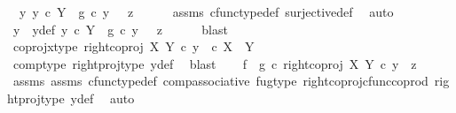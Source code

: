 \begin{isabellebody}
\ {\isachardoublequoteopen}{\isasymexists}\ y{\isachardot}{\kern0pt}\ y\ {\isasymin}\isactrlsub c\ Y\ {\isasymand}\ g\ {\isasymcirc}\isactrlsub c\ y\ \ {\isacharequal}{\kern0pt}\ z{\isachardoublequoteclose}\isanewline
\ \ \ \ \isamarkupfalse%
\ assms{\isacharparenleft}{\kern0pt}{}{\isacharcomma}{\kern0pt}{}{\isacharparenright}{\kern0pt}\ cfunc{\isacharunderscore}{\kern0pt}type{\isacharunderscore}{\kern0pt}def\ surjective{\isacharunderscore}{\kern0pt}def\ \isamarkupfalse%
\ auto\isanewline
\ \ \isamarkupfalse%
\ \isamarkupfalse%
\ y\ \ y{\isacharunderscore}{\kern0pt}def{\isacharcolon}{\kern0pt}\ {\isachardoublequoteopen}y\ {\isasymin}\isactrlsub c\ Y\ {\isasymand}\ g\ {\isasymcirc}\isactrlsub c\ y\ \ {\isacharequal}{\kern0pt}\ z{\isachardoublequoteclose}\isanewline
\ \ \ \ \isamarkupfalse%
\ blast\isanewline
\ \ \isamarkupfalse%
\ coproj{\isacharunderscore}{\kern0pt}x{\isacharunderscore}{\kern0pt}type{\isacharcolon}{\kern0pt}\ {\isachardoublequoteopen}right{\isacharunderscore}{\kern0pt}coproj\ X\ Y\ {\isasymcirc}\isactrlsub c\ y\ \ {\isasymin}\isactrlsub c\ X\ {\isasymCoprod}\ Y{\isachardoublequoteclose}\isanewline
\ \ \ \ \isamarkupfalse%
\ comp{\isacharunderscore}{\kern0pt}type\ right{\isacharunderscore}{\kern0pt}proj{\isacharunderscore}{\kern0pt}type\ y{\isacharunderscore}{\kern0pt}def\ \isamarkupfalse%
\ blast\isanewline
\ \ \isamarkupfalse%
\ {\isachardoublequoteopen}{\isacharparenleft}{\kern0pt}f\ {\isasymamalg}\ g{\isacharparenright}{\kern0pt}\ {\isasymcirc}\isactrlsub c\ {\isacharparenleft}{\kern0pt}right{\isacharunderscore}{\kern0pt}coproj\ X\ Y\ {\isasymcirc}\isactrlsub c\ y{\isacharparenright}{\kern0pt}\ {\isacharequal}{\kern0pt}\ z{\isachardoublequoteclose}\isanewline
\ \ \ \ \isamarkupfalse%
\ assms{\isacharparenleft}{\kern0pt}{}{\isacharparenright}{\kern0pt}\ assms{\isacharparenleft}{\kern0pt}{}{\isacharparenright}{\kern0pt}\ cfunc{\isacharunderscore}{\kern0pt}type{\isacharunderscore}{\kern0pt}def\ comp{\isacharunderscore}{\kern0pt}associative\ fug{\isacharunderscore}{\kern0pt}type\ right{\isacharunderscore}{\kern0pt}coproj{\isacharunderscore}{\kern0pt}cfunc{\isacharunderscore}{\kern0pt}coprod\ right{\isacharunderscore}{\kern0pt}proj{\isacharunderscore}{\kern0pt}type\ y{\isacharunderscore}{\kern0pt}def\ \isamarkupfalse%
\ auto\isanewline
\ \ \isamarkupfalse%
\ \isamarkupfalse%

\end{isabellebody}

